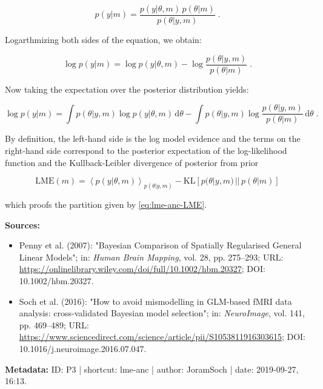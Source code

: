 \documentclass[a4paper,12pt,twoside]{book}
\begin{document}
\begin{equation} \label{eq:lme-anc-AnC-s2}
p(y|m) = \frac{p(y|\theta,m) \, p(\theta|m)}{p(\theta|y,m)} \; .
\end{equation}

Logarthmizing both sides of the equation, we obtain:

\begin{equation} \label{eq:lme-anc-AnC-s3}
\log p(y|m) = \log p(y|\theta,m) - \log \frac{p(\theta|y,m)}{p(\theta|m)} \; .
\end{equation}

Now taking the expectation over the posterior distribution yields:

\begin{equation} \label{eq:lme-anc-AnC-s4}
\log p(y|m) = \int p(\theta|y,m) \log p(y|\theta,m) \, \mathrm{d}\theta - \int p(\theta|y,m) \log \frac{p(\theta|y,m)}{p(\theta|m)} \, \mathrm{d}\theta \; .
\end{equation}

By definition, the left-hand side is the log model evidence and the terms on the right-hand side correspond to the posterior expectation of the log-likelihood function and the Kullback-Leibler divergence of posterior from prior

\begin{equation} \label{eq:lme-anc-LME-AnC}
\mathrm{LME}(m) = \left\langle p(y|\theta,m) \right\rangle_{p(\theta|y,m)} - \mathrm{KL} \left[ p(\theta|y,m) \, || \, p(\theta|m) \right]
\end{equation}

which proofs the partition given by \eqref{eq:lme-anc-LME}.


\vspace{1em}
\textbf{Sources:}
\begin{itemize}
\item Penny et al. (2007): "Bayesian Comparison of Spatially Regularised General Linear Models"; in: \textit{Human Brain Mapping}, vol. 28, pp. 275–293; URL: \url{https://onlinelibrary.wiley.com/doi/full/10.1002/hbm.20327}; DOI: 10.1002/hbm.20327.
\item Soch et al. (2016): "How to avoid mismodelling in GLM-based fMRI data analysis: cross-validated Bayesian model selection"; in: \textit{NeuroImage}, vol. 141, pp. 469–489; URL: \url{https://www.sciencedirect.com/science/article/pii/S1053811916303615}; DOI: 10.1016/j.neuroimage.2016.07.047.
\end{itemize}


\vspace{1em}
\textbf{Metadata:} ID: P3 | shortcut: lme-anc | author: JoramSoch | date: 2019-09-27, 16:13.
\vspace{1em}
\end{document}

